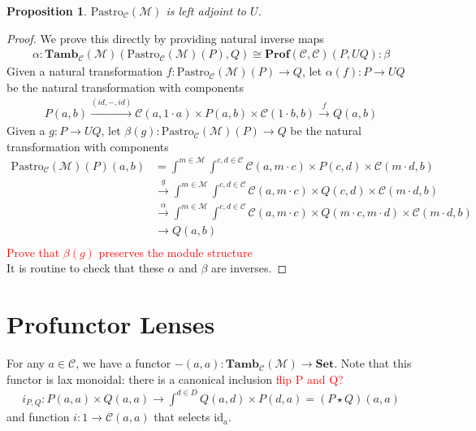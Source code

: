\documentclass[11pt,a4paper]{amsart}
\theoremstyle{plain}
\newtheorem{proposition}[theorem]{Proposition}
\theoremstyle{definition}
\newcommand{\id}{\mathrm{id}}
\newcommand{\C}{\mathscr{C}}
\newcommand{\M}{\mathscr{M}}
\newcommand{\Pastro}{\mathrm{Pastro}}
\newcommand{\Set}{\mathbf{Set}}
\newcommand{\Prof}{\mathbf{Prof}}
\newcommand{\Tamb}{\mathbf{Tamb}}
\newcommand{\todo}[1]{\textcolor{red}{\small #1}}
\begin{document}
\begin{proposition}
$\Pastro_\C(\M)$ is left adjoint to $U$.
\end{proposition}
\begin{proof}
We prove this directly by providing natural inverse maps
\begin{align*}
\alpha : \Tamb_\C(\M)(\Pastro_\C(\M)(P), Q) \cong \Prof(\C, \C)(P, UQ) : \beta
\end{align*}
Given a natural transformation $f : \Pastro_\C(\M)(P) \to Q$, let $\alpha(f) : P \to UQ$ be the natural transformation with components
\begin{align*}
P(a,b) \xrightarrow{(id, -, id)} \C(a, 1 \cdot a) \times P(a,b) \times \C(1 \cdot b, b) \xrightarrow{f} Q(a,b)
\end{align*} 
Given a $g : P \to UQ$, let $\beta(g) : \Pastro_\C(\M)(P) \to Q$ be the natural transformation with components
\begin{align*}
\Pastro_\C(\M)(P)(a,b) &= \int^{m \in \M} \int^{c,d \in \C} \C(a, m \cdot c) \times P(c,d) \times  \C(m \cdot d, b) \\
&\xrightarrow{g}
\int^{m \in \M} \int^{c,d \in \C} \C(a, m \cdot c) \times Q(c,d) \times  \C(m \cdot d, b) \\
&\xrightarrow{\alpha}
\int^{m \in \M} \int^{c,d \in \C} \C(a, m \cdot c) \times Q(m\cdot c,m\cdot d) \times  \C(m \cdot d, b) \\
&\to Q(a,b) \\
\end{align*}
\todo{Prove that $\beta(g)$ preserves the module structure}\\
It is routine to check that these $\alpha$ and $\beta$ are inverses.
\end{proof}



\section{Profunctor Lenses}

For any $a \in \C$, we have a functor $-(a, a) : \Tamb_\C(\M) \to \Set$. Note that this functor is lax monoidal: there is a canonical inclusion \todo{flip P and Q?}
\begin{align*}
i_{P,Q} : P(a,a)\times Q(a,a) \to \int^{d \in D} Q(a,d) \times P(d,a) = (P \star Q)(a,a)
\end{align*}
and function $i : 1 \to \C(a,a)$ that selects $\id_a$.
\end{document}
